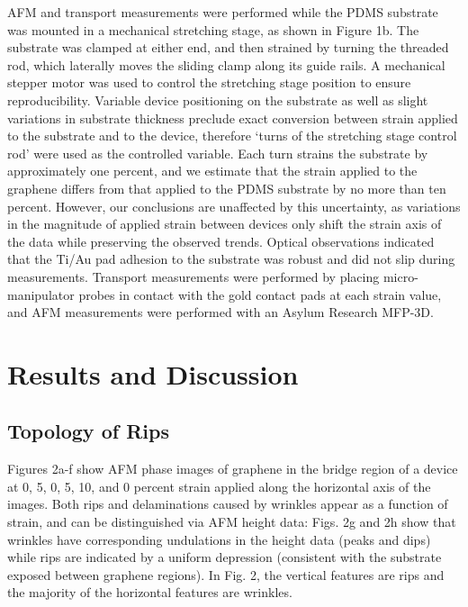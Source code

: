\documentclass[%
 aps,
 pra,
 longbibliography,
 amsmath,amssymb,
 reprint,
 superscriptaddress,
]{revtex4-1}
\begin{document}
AFM and transport measurements were performed while the PDMS substrate was
mounted in a mechanical stretching stage, as shown in Figure 1b. The substrate
was clamped at either end, and then strained by turning the threaded rod, which
laterally moves the sliding clamp along its guide rails. A mechanical stepper
motor was used to control the stretching stage position to ensure
reproducibility. Variable device positioning on the substrate as well as slight
variations in substrate thickness preclude exact conversion between strain
applied to the substrate and to the device, therefore `turns of the stretching
stage control rod' were used as the controlled variable. Each turn strains the
substrate by approximately one percent, and we estimate that the strain applied
to the graphene differs from that applied to the PDMS substrate by no more than
ten percent. However, our conclusions are unaffected by this uncertainty, as
variations in the magnitude of applied strain between devices only shift the
strain axis of the data while preserving the observed trends. Optical
observations indicated that the Ti/Au pad adhesion to the substrate was robust
and did not slip during measurements. Transport measurements were performed by
placing micro-manipulator probes in contact with the gold contact pads at each
strain value, and AFM measurements were performed with an Asylum Research
MFP-3D.

\section{Results and Discussion}

\subsection{Topology of Rips}
Figures 2a-f show AFM phase images of graphene in the bridge region of a device
at 0, 5, 0, 5, 10, and 0 percent strain applied along the horizontal axis of
the images. Both rips and delaminations caused by wrinkles appear as a function
of strain, and can be distinguished via AFM height data: Figs. 2g and 2h show
that wrinkles have corresponding undulations in the height data (peaks and
dips) while rips are indicated by a uniform depression (consistent with the
substrate exposed between graphene regions). In Fig. 2, the vertical features
are rips and the majority of the horizontal features are wrinkles.
\end{document}
